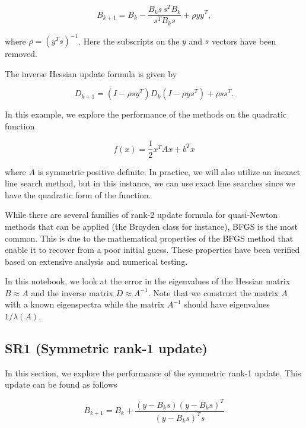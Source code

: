 \documentclass[11pt]{article}
\begin{document}
\begin{equation*}
    B_{k+1} = B_{k} - \frac{B_{k} s\, s^{T} B_{k}}{s^{T} B_{k} s} + \rho y y^{T},
\end{equation*}

where \(\rho = (y^{T} s)^{-1}\). Here the subscripts on the \(y\) and
\(s\) vectors have been removed.

The inverse Hessian update formula is given by

\begin{equation*}
    D_{k+1} = (I - \rho s y^{T}) D_{k} (I - \rho y s^{T}) + \rho s s^{T}.
\end{equation*}

In this example, we explore the performance of the methods on the
quadratic function

\begin{equation*}
    f(x) = \frac{1}{2}x^{T} A x + b^{T}x
\end{equation*}

where \(A\) is symmetric positive definite. In practice, we will also
utilize an inexact line search method, but in this instance, we can use
exact line searches since we have the quadratic form of the function.

While there are several families of rank-2 update formula for
quasi-Newton methods that can be applied (the Broyden class for
instance), BFGS is the most common. This is due to the mathematical
properties of the BFGS method that enable it to recover from a poor
initial guess. These properties have been verified based on extensive
analysis and numerical testing.

In this notebook, we look at the error in the eigenvalues of the Hessian
matrix \(B \approx A\) and the inverse matrix \(D \approx A^{-1}\). Note
that we construct the matrix \(A\) with a known eigenspectra while the
matrix \(A^{-1}\) should have eigenvalues \(1/\lambda(A)\).

\subsection{SR1 (Symmetric rank-1
update)}\label{sr1-symmetric-rank-1-update}

In this section, we explore the performance of the symmetric rank-1
update. This update can be found as follows

\begin{equation*}
    B_{k+1} = B_{k} + \frac{(y - B_{k} s)(y - B_{k} s)^{T}}{(y - B_{k} s)^T s}
\end{equation*}
\end{document}
